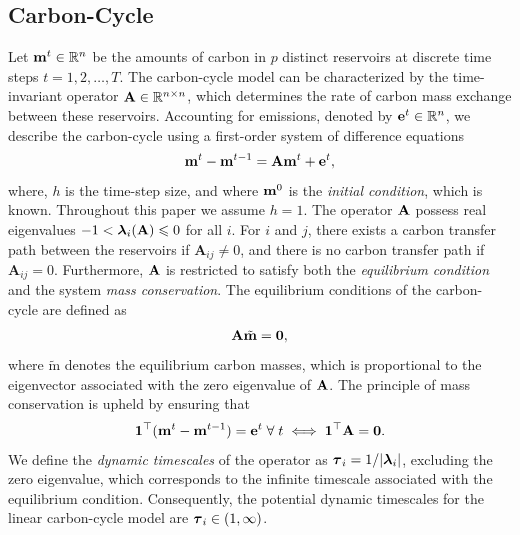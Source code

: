 \documentclass[11pt, a4paper, pdftex, twoside, dvipsnames]{article}
\newcommand{\bb}[1]{\boldsymbol{\bold{#1}}}
\newcommand{\bbt}[1]{\tilde{\boldsymbol{\mathrm{#1}}}}
\begin{document}
\subsection{Carbon-Cycle}\label{sec:carbon_cycle}
Let $\bb{m}^t \in \mathbb{R}^{n}$ be the amounts of carbon in $p$ distinct reservoirs at discrete time steps $t = 1, 2, \ldots, T$. 
The carbon-cycle model can be characterized by the time-invariant operator $\bb{A} \in \mathbb{R}^{n \times n}$, which determines the rate of carbon mass exchange between these reservoirs. 
Accounting for emissions, denoted by $\bb{e}^t \in \mathbb{R}^{n}$, we describe the carbon-cycle using a first-order system of difference equations
%
\begin{align} \label{eq:clim_model.1}
    \bb{m}^t -\bb{m}^{t-1}  = \bb{A}\bb{m}^t +\bb{e}^{t},
\end{align}
%
where, $h$ is the time-step size, and where $\bb{m}^{0}$ is the \textit{initial condition}, which is known.
Throughout this paper we assume $h=1$.
The operator $\bb{A}$ possess real eigenvalues $-1 < \bb{\lambda}_i(\bb{A}) \leqslant 0$ for all $i$. 
For $i$ and $j$, there exists a carbon transfer path between the reservoirs if $\mathbf{A}_{ij} \neq 0$, and there is no carbon transfer path if $\mathbf{A}_{ij}=0$.
Furthermore, $\bb{A}$ is restricted to satisfy both the \emph{equilibrium condition} and the system \emph{mass conservation}. 
The equilibrium conditions of the carbon-cycle are defined as
%
\begin{align}\label{eq:clim_model.2}
    \bb{A}\bbt{m}=\bb{0},
\end{align}
%
where $\bbt{m}$ denotes the equilibrium carbon masses, which is proportional to the eigenvector associated with the zero eigenvalue of $\bb{A}$. 
The principle of mass conservation is upheld by ensuring that
%
\begin{align}\label{eq:clim_model.3}
    \bb{1}^\top (\bb{m}^{t}-\bb{m}^{t-1})= \bb{e}^{t}\; \forall \; t \iff \bb{1}^\top \bb{A} =\bb{0}.
\end{align}
%
We define the \textit{dynamic timescales} of the operator as $\bb{\tau}_i = 1/|\bb{\lambda}_i|$, excluding the zero eigenvalue, which corresponds to the infinite timescale associated with the equilibrium condition. 
Consequently, the potential dynamic timescales for the linear carbon-cycle model are $\bb{\tau}_i \in (1,\infty)$. 
\end{document}
